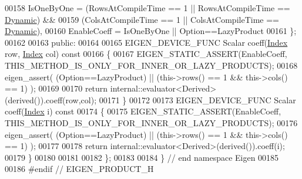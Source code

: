 \begin{DoxyCode}
00158       IsOneByOne = (RowsAtCompileTime == 1 || RowsAtCompileTime == \hyperlink{namespace_eigen_ad81fa7195215a0ce30017dfac309f0b2}{Dynamic}) && 
00159                    (ColsAtCompileTime == 1 || ColsAtCompileTime == \hyperlink{namespace_eigen_ad81fa7195215a0ce30017dfac309f0b2}{Dynamic}),
00160       EnableCoeff = IsOneByOne || Option==LazyProduct
00161     \};
00162     
00163   \textcolor{keyword}{public}:
00164   
00165     EIGEN\_DEVICE\_FUNC Scalar coeff(\hyperlink{namespace_eigen_a62e77e0933482dafde8fe197d9a2cfde}{Index} row, \hyperlink{namespace_eigen_a62e77e0933482dafde8fe197d9a2cfde}{Index} col)\textcolor{keyword}{ const}
00166 \textcolor{keyword}{    }\{
00167       EIGEN\_STATIC\_ASSERT(EnableCoeff, THIS\_METHOD\_IS\_ONLY\_FOR\_INNER\_OR\_LAZY\_PRODUCTS);
00168       eigen\_assert( (Option==LazyProduct) || (this->rows() == 1 && this->cols() == 1) );
00169       
00170       \textcolor{keywordflow}{return} internal::evaluator<Derived>(derived()).coeff(row,col);
00171     \}
00172 
00173     EIGEN\_DEVICE\_FUNC Scalar coeff(\hyperlink{namespace_eigen_a62e77e0933482dafde8fe197d9a2cfde}{Index} i)\textcolor{keyword}{ const}
00174 \textcolor{keyword}{    }\{
00175       EIGEN\_STATIC\_ASSERT(EnableCoeff, THIS\_METHOD\_IS\_ONLY\_FOR\_INNER\_OR\_LAZY\_PRODUCTS);
00176       eigen\_assert( (Option==LazyProduct) || (this->rows() == 1 && this->cols() == 1) );
00177       
00178       \textcolor{keywordflow}{return} internal::evaluator<Derived>(derived()).coeff(i);
00179     \}
00180     
00181   
00182 \};
00183 
00184 \} \textcolor{comment}{// end namespace Eigen}
00185 
00186 \textcolor{preprocessor}{#endif // EIGEN\_PRODUCT\_H}
\end{DoxyCode}
